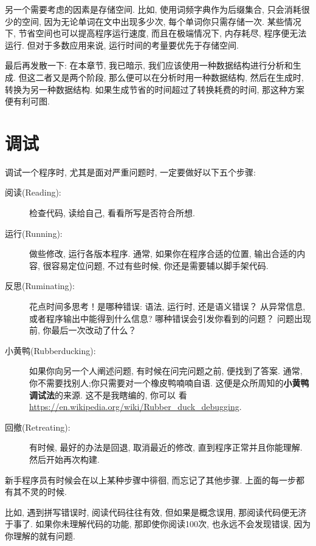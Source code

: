 \documentclass[10pt]{book}
\begin{document}
另一个需要考虑的因素是存储空间. 
比如, 使用词频字典作为后缀集合, 只会消耗很少的空间, 
因为无论单词在文中出现多少次, 每个单词你只需存储一次. 
某些情况下, 节省空间也可以提高程序运行速度, 而且在极端情况下, 
内存耗尽, 程序便无法运行. 但对于多数应用来说, 运行时间的考量要优先于存储空间. 

最后再发散一下: 在本章节, 我已暗示, 我们应该使用一种数据结构进行分析和生成. 
但这二者又是两个阶段, 那么便可以在分析时用一种数据结构, 然后在生成时, 
转换为另一种数据结构. 如果生成节省的时间超过了转换耗费的时间, 
那这种方案便有利可图. 


\section{调试}

调试一个程序时, 尤其是面对严重问题时, 一定要做好以下五个步骤:

\begin{description}

\item[阅读(Reading):] 检查代码, 读给自己, 看看所写是否符合所想. 

\item[运行(Running):] 做些修改, 运行各版本程序. 通常, 如果你在程序合适的位置, 
输出合适的内容, 很容易定位问题, 不过有些时候, 你还是需要辅以脚手架代码. 

\item[反思(Ruminating):] 花点时间多思考！是哪种错误: 语法, 运行时, 还是语义错误？
从异常信息, 或者程序输出中能得到什么信息? 哪种错误会引发你看到的问题？
问题出现前, 你最后一次改动了什么？

\item[小黄鸭(Rubberducking):] 如果你向另一个人阐述问题, 有时候在问完问题之前, 
便找到了答案. 
通常, 你不需要找别人;你只需要对一个橡皮鸭喃喃自语. 
这便是众所周知的{\bf 小黄鸭调试法}的来源. 这不是我瞎编的, 你可以
看\url{https://en.wikipedia.org/wiki/Rubber_duck_debugging}.

\item[回撤(Retreating):] 有时候, 最好的办法是回退, 
取消最近的修改, 直到程序正常并且你能理解. 然后开始再次构建. 

\end{description}

新手程序员有时候会在以上某种步骤中徘徊, 而忘记了其他步骤. 
上面的每一步都有其不灵的时候. 

比如, 遇到拼写错误时, 阅读代码往往有效, 但如果是概念误用, 那阅读代码便无济于事了. 
如果你未理解代码的功能, 那即使你阅读100次, 也永远不会发现错误, 
因为你理解的就有问题. 
\end{document}
